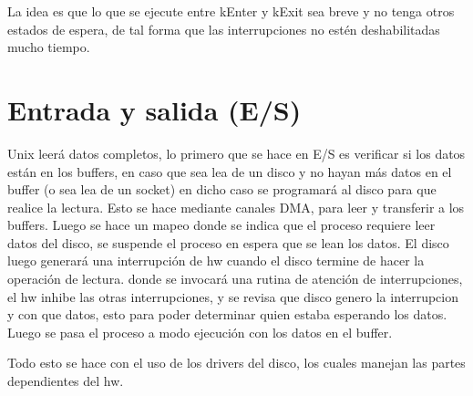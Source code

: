 

La idea es que lo que se ejecute entre kEnter y kExit sea breve  y no tenga otros estados de espera, de tal forma que las interrupciones no estén deshabilitadas mucho tiempo.

\section{Entrada y salida (E/S)}
Unix leerá datos completos, lo primero que se hace en E/S es verificar si los datos están en los buffers, en caso que sea lea de un disco y no hayan más datos en el buffer (o sea lea de un socket) en dicho caso se programará al disco para que realice la lectura. Esto se hace mediante canales DMA, para leer y transferir a los buffers. Luego se hace un mapeo donde se indica que el proceso requiere leer datos del disco, se suspende el proceso en espera que se lean los datos. El disco luego generará una interrupción de hw cuando el disco termine de hacer la operación de lectura. donde se invocará una rutina de atención de interrupciones, el hw inhibe las otras interrupciones, y se revisa que disco genero la interrupcion y con que datos, esto para poder determinar quien estaba esperando los datos. Luego se pasa el proceso a modo ejecución con los datos en el buffer.

Todo esto se hace con el uso de los drivers del disco, los cuales manejan las partes dependientes del hw.

